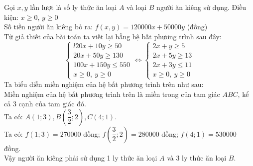\begin{bt}
{\begin{center}
	\end{center}
	Gọi $x, y$ lần lượt là số ly thức ăn loại $A$ và loại $B$ người ăn kiêng sử dụng. Điều kiện: $x\ge 0$, $y\ge 0$\\
	Số tiền người ăn kiêng bỏ ra: $f(x, y)=120000 x+50000 y$ (đồng)\\
	Từ giả thiết của bài toán ta viết lại bằng hệ bất phương trình sau đây:
	$$
	\begin{cases} { l } 
		{ 2 0 x + 1 0 y \geq 5 0 } \\
		{ 2 0 x + 5 0 y \geq 1 3 0 } \\
		{ 1 0 0 x + 1 5 0 y \leq 5 5 0 }\\
		x\ge 0,\ y\ge 0
	\end{cases} \Leftrightarrow \begin{cases}
		2 x+y \geq 5 \\
		2 x+5 y \geq 13 \\
		2 x+3 y \leq 11 \\
		x\ge 0,\ y\ge 0
	\end{cases}
	$$
	Ta biểu diễn miền nghiệm của hệ bất phương trình trên như sau:\\
	Miền nghiệm của hệ bất phương trình trên là miền trong của tam giác $A B C$, kể cả 3 cạnh của tam giác đó.\\
	Ta có: $A(1 ; 3), B\left(\dfrac{3}{2} ; 2\right), C(4 ; 1)$.\\
	Ta có: $f(1 ; 3)=270000$ đồng; $f\left(\dfrac{3}{2} ; 2\right)=280000$ đồng; $f(4 ; 1)=530000$ đồng.\\
	Vậy người ăn kiêng phải sử dụng 1 ly thức ăn loại $A$ và 3 ly thức ăn loại $B$.
	}
\end{bt}

